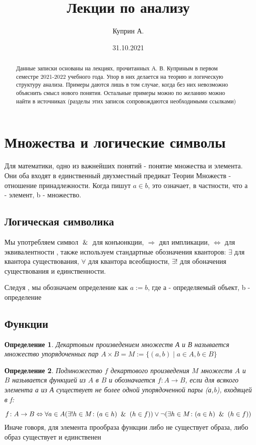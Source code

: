 \documentclass[a4paper]{article}
\title{Лекции по анализу}
\date{31.10.2021}
\author{Куприн А.}
\newtheorem{defin}{Определение}
\begin{document}
\maketitle
\tableofcontents
\newpage
\begin{abstract}
Данные записки основаны на лекциях, прочитанных А. В. Куприным в первом
семестре 2021-2022 учебного года. Упор в них делается на теорию и логическую
структуру анализа. Примеры даются лишь в том случае, когда без них невозможно
объяснить смысл нового понятия. Остальные примеры можно по желанию можно найти
в источниках (разделы этих записок сопровождаются необходимыми ссылками)
\end{abstract}
\section{Множества и логические символы}
Для математики, одно из важнейших понятий - понятие множества и элемента. Они
оба входят в единственный двухместный предикат Теории Множеств - отношение
принадлежности. Когда пишут $a\in b$, это означает, в частности, что а -
элемент, b - множество.
\subsection{Логическая символика}
Мы употребляем символ $\And$ для конъюнкции, $\Rightarrow$ дял импликации, 
$\Leftrightarrow$ для эквивалентности , также используем стандартные 
обозначения кванторов: $\exists$ для квантора существования, $\forall$ для 
квантора всеобщности, $\exists!$ для обоначения существования и единственности. 

Следуя \cite{z}, мы обозначаем определение как $a:=b$, где а - определяемый
объект, b - определение
\subsection{Функции}
\begin{defin}
Декартовым произведением множеств А и В называется множество упорядоченных пар 
$A\times B=M:=\{(a,b)\mid a\in A, b\in B\}$
\end{defin}
\begin{defin}
Подмножество $f$ декартового произведения $M$ множеств $A$ и $B$ называется 
функцией из $A$ в $B$ и обозначается $f\colon A\to B$, если для всякого
элемента а из А существует не более одной упорядоченной пары (а,b), входящей 
в f:
\end{defin}
$$f\colon A\to B \Leftrightarrow \forall a\in A (\exists!h\in M\colon(a\in h)
\And(h\in f))\vee\lnot(\exists h\in M\colon(a\in h)\And(h\in f))$$
Иначе говоря, для элемента прообраза функции либо не существует образа, либо 
образ существует и единственен
\end{document}
